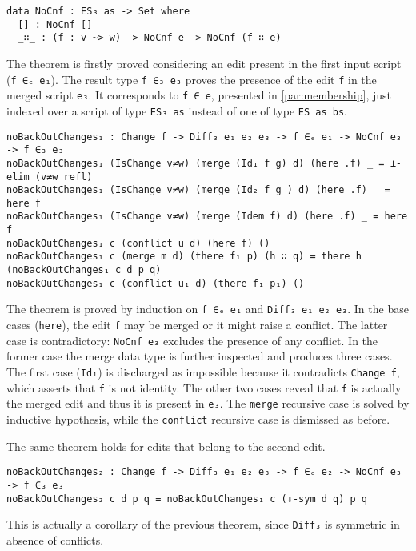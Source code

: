 \documentclass[../Thesis.tex]{subfiles}
\begin{document}
\begin{verbatim}	
data NoCnf : ES₃ as -> Set where
  [] : NoCnf []
  _∷_ : (f : v ~> w) -> NoCnf e -> NoCnf (f ∷ e)
\end{verbatim}
			
	The theorem is firstly proved considering an edit present in
	the first input script (\texttt{f ∈ₑ e₁}).
	The result type \texttt{f ∈₃ e₃} proves the presence of the edit \texttt{f}
	in the merged script \texttt{e₃}. 
	It corresponds to \texttt{f ∈ e}, presented in 
	\ref{par:membership}, just indexed over a script of type \texttt{ES₃ as}
	instead of one of 	type \texttt{ES as bs}.
	
\begin{verbatim}
noBackOutChanges₁ : Change f -> Diff₃ e₁ e₂ e₃ -> f ∈ₑ e₁ -> NoCnf e₃ -> f ∈₃ e₃
noBackOutChanges₁ (IsChange v≠w) (merge (Id₁ f g) d) (here .f) _ = ⊥-elim (v≠w refl)
noBackOutChanges₁ (IsChange v≠w) (merge (Id₂ f g ) d) (here .f) _ = here f
noBackOutChanges₁ (IsChange v≠w) (merge (Idem f) d) (here .f) _ = here f
noBackOutChanges₁ c (conflict u d) (here f) ()
noBackOutChanges₁ c (merge m d) (there f₁ p) (h ∷ q) = there h (noBackOutChanges₁ c d p q)
noBackOutChanges₁ c (conflict u₁ d) (there f₁ p₁) ()
\end{verbatim}

	The theorem is proved by induction on \texttt{f ∈ₑ e₁} and 
	\texttt{Diff₃ e₁ e₂ e₃}.
	In the base cases (\texttt{here}), the edit \texttt{f} may be merged or
	it might raise a conflict. The latter case is contradictory: \texttt{NoCnf e₃}
	excludes the presence of any conflict.
	In the former case the merge data type is further inspected and produces 
	three cases.
	The first case (\texttt{Id₁}) is discharged as impossible because it 
	contradicts \texttt{Change f}, which asserts that \texttt{f} is not identity.
	The other two cases reveal that \texttt{f} is actually the merged edit
	and thus it is present in \texttt{e₃}.
	The \texttt{merge} recursive case is solved by inductive hypothesis, while
	the \texttt{conflict} recursive case is dismissed as before.

	The same theorem holds for edits that belong to the second edit.
	
\begin{verbatim}
noBackOutChanges₂ : Change f -> Diff₃ e₁ e₂ e₃ -> f ∈ₑ e₂ -> NoCnf e₃ -> f ∈₃ e₃
noBackOutChanges₂ c d p q = noBackOutChanges₁ c (⇓-sym d q) p q
\end{verbatim}
	
	This is actually a corollary of the previous theorem, since
	\texttt{Diff₃} is symmetric in absence of conflicts.
	
\end{document}
